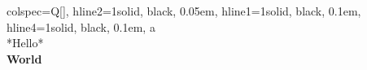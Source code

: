 \begin{table}
\centering
\begin{talltblr}[         %
caption={HTML render 1st row. LaTeX render 2nd row.},
]                     %
{                     %
colspec={Q[]},
hline{2}={1}{solid, black, 0.05em},
hline{1}={1}{solid, black, 0.1em},
hline{4}={1}{solid, black, 0.1em},
}                     %
a \\
*Hello* \\
\textbf{World} \\
\end{talltblr}
\end{table} 
